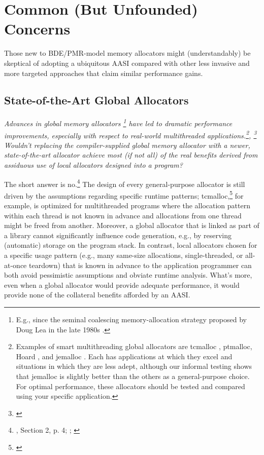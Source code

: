 \section{Common (But Unfounded) Concerns}
Those new to BDE/PMR-model memory allocators might (understandably) be
skeptical of adopting a ubiquitous AASI compared with other less invasive and more
targeted approaches that claim similar performance gains.

\subsection{State-of-the-Art Global Allocators}
\emph{Advances in global memory allocators
\footnote{E.g., since the seminal coalescing memory-allocation strategy proposed by Doug Lea in the late
1980s \cite{lea89}.}
have led to dramatic performance
improvements, especially with respect to real-world multithreaded
applications.\footnote{Examples of smart multithreading global allocators are tcmalloc \cite{ghemawat07}, ptmalloc, Hoard
\cite{berger00}, and jemalloc \cite{evans02}. Each has applications at which they excel and situations in
which they are less adept, although our informal testing shows that jemalloc is slightly better than
the others as a general-purpose choice. For optimal performance, these allocators should be tested
and compared using your specific application.}, \footnote{\cite{berger02}}
Wouldn’t replacing the compiler-supplied global memory allocator with a newer,
state-of-the-art allocator achieve most (if not all) of the real benefits derived from assiduous
use of local allocators designed into a program?}

The short answer is no.\footnote{\cite{lakos16}, Section 2, p. 4; \cite{bleaney16}; \cite{lakos17b}} The design of every general-purpose allocator is still driven
by the assumptions regarding specific runtime patterns; tcmalloc,\footnote{\cite{ghemawat07}} for example, is
optimized for multithreaded programs where the allocation pattern within each
thread is not known in advance and allocations from one thread might be freed from
another. Moreover, a global allocator that is linked as part of a library cannot
significantly influence code generation, e.g., by reserving (automatic) storage on the
program stack. In contrast, local allocators chosen for a specific usage pattern (e.g.,
many same-size allocations, single-threaded, or all-at-once teardown) that is known
in advance to the application programmer can both avoid pessimistic assumptions
and obviate runtime analysis. What’s more, even when a global allocator would
provide adequate performance, it would provide none of the collateral benefits
afforded by an AASI.

